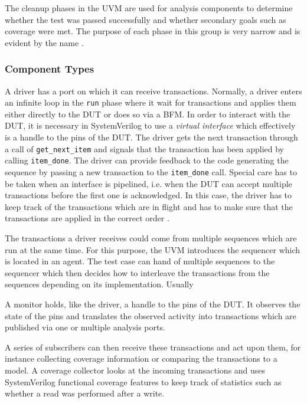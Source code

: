 \documentclass[12pt]{report}
\newcommand{\ttt}{\texttt}
\begin{document}
The cleanup phases in the UVM are used for analysis components to determine whether the test was passed successfully
and whether secondary goals such as coverage were met. The purpose of each phase in this group is very narrow and is
evident by the name \cite[ch. 4.6]{mehta2018asic}.

\subsubsection{Component Types} %

A driver has a port on which it can receive transactions. Normally, a driver enters an infinite loop in the \ttt{run}
phase where it wait for transactions and applies them either directly to the DUT or does so via a BFM. In order to
interact with the DUT, it is necessary in SystemVerilog to use a \textit{virtual interface} which effectively is a
handle to the pins of the DUT. The driver gets the next transaction through a call of \ttt{get\_next\_item} and
signals that the transaction has been applied by calling \ttt{item\_done}. The driver can provide feedback to the
code generating the sequence by passing a new transaction to the \ttt{item\_done} call. Special care has to be taken
when an interface is pipelined, i.e. when the DUT can accept multiple transactions before the first one is
acknowledged. In this case, the driver has to keep track of the transactions which are in flight and has to make sure
that the transactions are applied in the correct order \cite[ch. 4.7]{mehta2018asic}.

The transactions a driver receives could come from multiple sequences which are run at the same time. For this
purpose, the UVM introduces the sequencer which is located in an agent. The test case can hand of multiple sequences
to the sequencer which then decides how to interleave the transactions from the sequences depending on its
implementation. Usually

A monitor holds, like the driver, a handle to the pins of the DUT. It observes the state of the pins and translates
the observed activity into transactions which are published via one or multiple analysis ports.

A series of subscribers can then receive these transactions and act upon them, for instance collecting coverage
information or comparing the transactions to a model. A coverage collector looks at the incoming transactions and
uses SystemVerilog functional coverage features to keep track of statistics such as whether a read was performed after a write.
\end{document}
